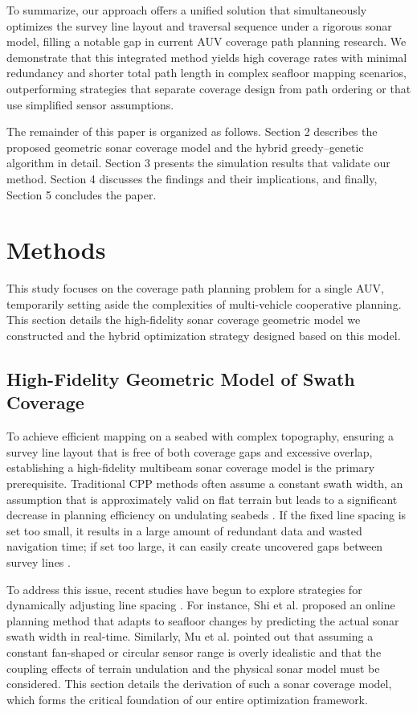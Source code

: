 \documentclass[compress]{cm}
\begin{document}
To summarize, our approach offers a unified solution that simultaneously optimizes the survey line layout and traversal sequence under a rigorous sonar model, filling a notable gap in current AUV coverage path planning research. We demonstrate that this integrated method yields high coverage rates with minimal redundancy and shorter total path length in complex seafloor mapping scenarios, outperforming strategies that separate coverage design from path ordering or that use simplified sensor assumptions.

The remainder of this paper is organized as follows. Section 2 describes the proposed geometric sonar coverage model and the hybrid greedy–genetic algorithm in detail. Section 3 presents the simulation results that validate our method. Section 4 discusses the findings and their implications, and finally, Section 5 concludes the paper.

\section{Methods}
This study focuses on the coverage path planning problem for a single AUV, temporarily setting aside the complexities of multi-vehicle cooperative planning. This section details the high-fidelity sonar coverage geometric model we constructed and the hybrid optimization strategy designed based on this model.

\subsection{High-Fidelity Geometric Model of Swath Coverage}
To achieve efficient mapping on a seabed with complex topography, ensuring a survey line layout that is free of both coverage gaps and excessive overlap, establishing a high-fidelity multibeam sonar coverage model is the primary prerequisite. Traditional CPP methods often assume a constant swath width, an assumption that is approximately valid on flat terrain but leads to a significant decrease in planning efficiency on undulating seabeds \cite{shi2020data}. If the fixed line spacing is set too small, it results in a large amount of redundant data and wasted navigation time; if set too large, it can easily create uncovered gaps between survey lines \cite{yordanova2020coverage, li2024multi}.

To address this issue, recent studies have begun to explore strategies for dynamically adjusting line spacing \cite{zhang2022online, yan2024dual}. For instance, Shi et al. \cite{shi2020data} proposed an online planning method that adapts to seafloor changes by predicting the actual sonar swath width in real-time. Similarly, Mu et al. \cite{xie2024three, mu2025coverage} pointed out that assuming a constant fan-shaped or circular sensor range is overly idealistic and that the coupling effects of terrain undulation and the physical sonar model must be considered. This section details the derivation of such a sonar coverage model, which forms the critical foundation of our entire optimization framework.
\end{document}
